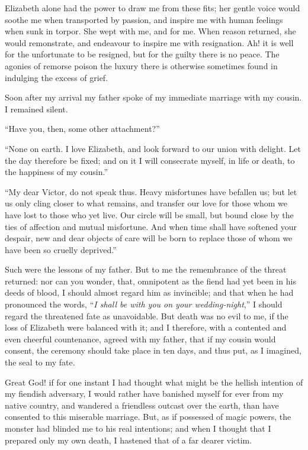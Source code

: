 Elizabeth alone had the power to
draw me from these fits; her gentle
voice would soothe me when transported
by passion, and inspire me with
human feelings when sunk in torpor.
She wept with me, and for me. When
reason returned, she would remonstrate,
and endeavour to inspire me with resignation.
Ah! it is well for the unfortunate
to be resigned, but for the
guilty there is no peace. The agonies
of remorse poison the luxury there is
otherwise sometimes found in indulging
the excess of grief.

Soon after my arrival my father
spoke of my immediate marriage with
my cousin. I remained silent.

``Have you, then, some other attachment?''

``None on earth. I love Elizabeth,
and look forward to our union with delight.
Let the day therefore be fixed;
and on it I will consecrate myself, in
life or death, to the happiness of my
cousin.''

``My dear Victor, do not speak thus.
Heavy misfortunes have befallen us;
but let us only cling closer to what remains,
and transfer our love for those
whom we have lost to those who yet
live. Our circle will be small, but
bound close by the ties of affection and
mutual misfortune. And when time
shall have softened your despair, new
and dear objects of care will be born
to replace those of whom we have been
so cruelly deprived.''

Such were the lessons of my father.
But to me the remembrance of the threat
returned: nor can you wonder, that,
omnipotent as the fiend had yet been
in his deeds of blood, I should almost
regard him as invincible; and that
when he had pronounced the words,
``\emph{I shall be with you on your wedding-night},''
I should regard the threatened
fate as unavoidable. But death was no
evil to me, if the loss of Elizabeth were
balanced with it; and I therefore, with
a contented and even cheerful countenance,
agreed with my father, that if
my cousin would consent, the ceremony
should take place in ten days, and
thus put, as I imagined, the seal to my
fate.

Great God! if for one instant I
had thought what might be the hellish
intention of my fiendish adversary, I
would rather have banished myself for
ever from my native country, and wandered
a friendless outcast over the earth,
than have consented to this miserable
marriage. But, as if possessed of
magic powers, the monster had blinded
me to his real intentions; and when I
thought that I prepared only my own
death, I hastened that of a far dearer
victim.

